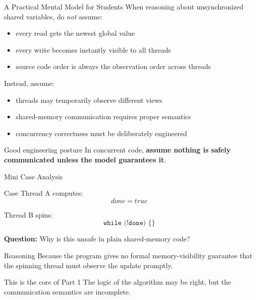 \documentclass[aspectratio=169,11pt]{beamer}
\begin{document}
	\begin{frame}{A Practical Mental Model for Students}
		When reasoning about unsynchronized shared variables, do \emph{not} assume:
		
		\begin{itemize}
			\item every read gets the newest global value
			\item every write becomes instantly visible to all threads
			\item source code order is always the observation order across threads
		\end{itemize}
		
		\vspace{0.35cm}
		
		Instead, assume:
		
		\begin{itemize}
			\item threads may temporarily observe different views
			\item shared-memory communication requires proper semantics
			\item concurrency correctness must be deliberately engineered
		\end{itemize}
		
		\vspace{0.35cm}
		
		\begin{alertblock}{Good engineering posture}
			In concurrent code, \textbf{assume nothing is safely communicated unless the model guarantees it}.
		\end{alertblock}
	\end{frame}
	
	\begin{frame}{Mini Case Analysis}
		\begin{block}{Case}
			Thread A computes:
			\[
			done = true
			\]
			
			Thread B spins:
			\[
			\texttt{while (!done) \{ \}}
			\]
		\end{block}
		
		\vspace{0.25cm}
		
		\textbf{Question:} Why is this unsafe in plain shared-memory code?
		
		\vspace{0.25cm}
		
		\begin{exampleblock}{Reasoning}
			Because the program gives no formal memory-visibility guarantee that the spinning thread must observe the update promptly.
		\end{exampleblock}
		
		\vspace{0.25cm}
		
		\begin{alertblock}{This is the core of Part 1}
			The logic of the algorithm may be right, but the communication semantics are incomplete.
		\end{alertblock}
	\end{frame}
	
\end{document}
